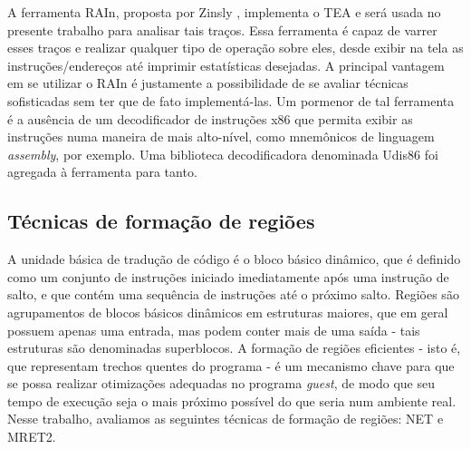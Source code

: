 \documentclass[12pt,twoside]{article}
\newcommand{\guest}{\emph{guest}}
\begin{document}
A ferramenta RAIn, proposta por Zinsly \cite{thesis-zinsly}, implementa o TEA e será usada no presente trabalho para analisar tais traços. Essa ferramenta é capaz de varrer esses traços e realizar qualquer tipo de operação sobre eles, desde exibir na tela as instruções/endereços até imprimir estatísticas desejadas. A principal vantagem em se utilizar o RAIn é justamente a possibilidade de se avaliar técnicas sofisticadas sem ter que de fato implementá-las. Um pormenor de tal ferramenta é a ausência de um decodificador de instruções x86 que permita exibir as instruções numa maneira de mais alto-nível, como mnemônicos de linguagem \emph{assembly}, por exemplo. Uma biblioteca decodificadora denominada Udis86 \cite{udis86-url} foi agregada à ferramenta para tanto.


\subsection{Técnicas de formação de regiões}
\label{sec-formacao}
A unidade básica de tradução de código é o bloco básico dinâmico, que é definido como um conjunto de instruções iniciado imediatamente após uma instrução de salto, e que contém uma sequência de instruções até o próximo salto. Regiões são agrupamentos de blocos básicos dinâmicos em estruturas maiores, que em geral possuem apenas uma entrada, mas podem conter mais de uma saída - tais estruturas são denominadas superblocos. A formação de regiões eficientes - isto é, que representam trechos quentes do programa - é um mecanismo chave para que se possa realizar otimizações adequadas no programa \guest, de modo que seu tempo de execução seja o mais próximo possível do que seria num ambiente real. Nesse trabalho, avaliamos as seguintes técnicas de formação de regiões: NET e MRET2. 
\end{document}
